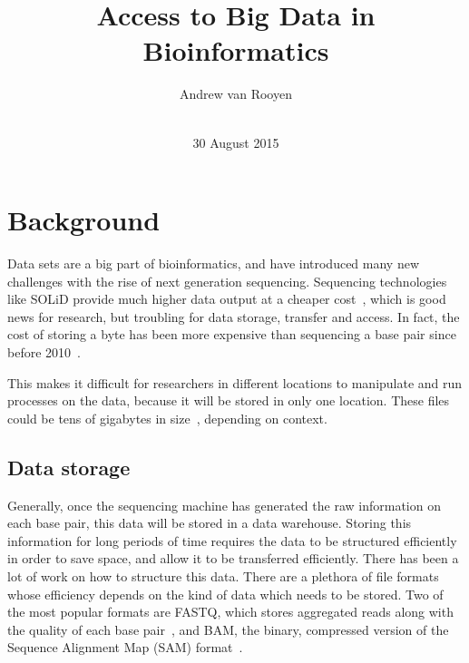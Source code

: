 \documentclass{sig-alternate-05-2015}
\begin{document}


\title{Access to Big Data in Bioinformatics}

\author{
\alignauthor
Andrew van Rooyen\\
       \\
}

\date{30 August 2015}


\maketitle
\begin{abstract}
\end{abstract}


\section{Background}

Data sets are a big part of bioinformatics, and have introduced many new challenges with the rise of next generation sequencing. Sequencing technologies like SOLiD provide much higher data output at a cheaper cost~\cite{shendure2008next}, which is good news for research, but troubling for data storage, transfer and access. In fact, the cost of storing a byte has been more expensive than sequencing a base pair since before 2010~\cite{baker2010next}.

This makes it difficult for researchers in different locations to manipulate and run processes on the data, because it will be stored in only one location. These files could be tens of gigabytes in size~\cite{deorowicz2011compression}, depending on context.

\subsection{Data storage}
Generally, once the sequencing machine has generated the raw information on each base pair, this data will be stored in a data warehouse. Storing this information for long periods of time requires the data to be structured efficiently in order to save space, and allow it to be transferred efficiently.
There has been a lot of work on how to structure this data. There are a plethora of file formats whose efficiency depends on the kind of data which needs to be stored. Two of the most popular formats are FASTQ, which stores aggregated reads along with the quality of each base pair~\cite{cock2010sanger}, and BAM, the binary, compressed version of the Sequence Alignment Map (SAM) format~\cite{SAMspec}.
\end{document}
